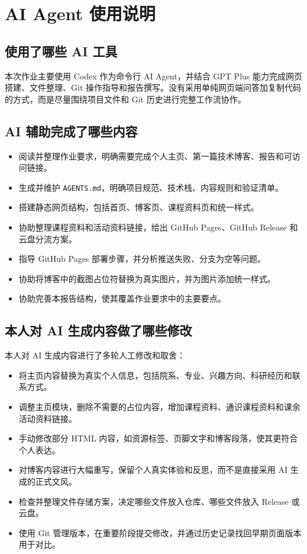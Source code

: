 \documentclass[UTF8,a4paper,12pt]{ctexart}
\begin{document}
\section{AI Agent 使用说明}

\subsection{使用了哪些 AI 工具}

本次作业主要使用 Codex 作为命令行 AI Agent，并结合 GPT Plus 能力完成网页搭建、文件整理、Git 操作指导和报告撰写。没有采用单纯网页端问答加复制代码的方式，而是尽量围绕项目文件和 Git 历史进行完整工作流协作。

\subsection{AI 辅助完成了哪些内容}

\begin{itemize}
  \item 阅读并整理作业要求，明确需要完成个人主页、第一篇技术博客、报告和可访问链接。
  \item 生成并维护 \texttt{AGENTS.md}，明确项目规范、技术栈、内容规则和验证清单。
  \item 搭建静态网页结构，包括首页、博客页、课程资料页和统一样式。
  \item 协助整理课程资料和活动资料链接，给出 GitHub Pages、GitHub Release 和云盘分流方案。
  \item 指导 GitHub Pages 部署步骤，并分析推送失败、分支为空等问题。
  \item 协助将博客中的截图占位符替换为真实图片，并为图片添加统一样式。
  \item 协助完善本报告结构，使其覆盖作业要求中的主要要点。
\end{itemize}

\subsection{本人对 AI 生成内容做了哪些修改}

本人对 AI 生成内容进行了多轮人工修改和取舍：

\begin{itemize}
  \item 将主页内容替换为真实个人信息，包括院系、专业、兴趣方向、科研经历和联系方式。
  \item 调整主页模块，删除不需要的占位内容，增加课程资料、通识课程资料和课余活动资料链接。
  \item 手动修改部分 HTML 内容，如资源标签、页脚文字和博客段落，使其更符合个人表达。
  \item 对博客内容进行大幅重写，保留个人真实体验和反思，而不是直接采用 AI 生成的正式文风。
  \item 检查并整理文件存储方案，决定哪些文件放入仓库、哪些文件放入 Release 或云盘。
  \item 使用 Git 管理版本，在重要阶段提交修改，并通过历史记录找回早期页面版本用于对比。
\end{itemize}
\end{document}
